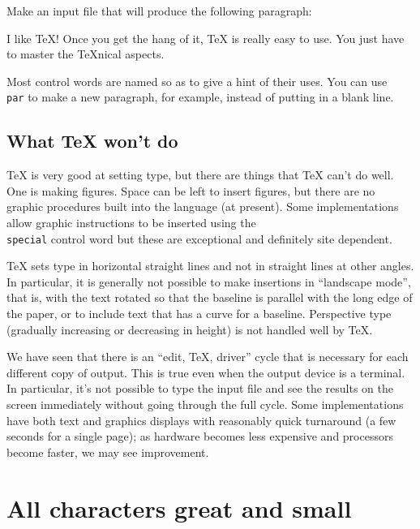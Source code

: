 \exercise Make an input file that will produce the following 
paragraph: 
 
I like \TeX! Once you get the hang of it, \TeX{} is really easy 
to use. You just have to master the \TeX nical aspects. 
 
Most control words are named so as to give a hint of their uses. 
You can use {\tt \\par} to make a new paragraph, for example, 
instead of putting in a blank line. 
 
\subsection{What \TeX{} won't do} 
 
\TeX{} is very good at setting type, but there are things that \TeX{} 
can't do well.  One is making figures.  Space can be left 
to insert figures, but there are no graphic procedures built into 
the language (at present).  Some implementations allow graphic 
instructions to be inserted using the {\tt \\special} control 
word but these are exceptional and definitely site dependent. 
 
\TeX{} sets type in horizontal straight lines and not in 
straight lines at other angles. In particular, it is generally 
not possible to make insertions in ``landscape mode'', that is, 
with the text rotated so that the baseline is parallel with 
the long edge of the paper, or to include text that has a curve for 
a baseline. Perspective type (gradually increasing or 
decreasing in height) is not handled well by \TeX\null. 
 
We have seen that there is an ``edit, \TeX{}, driver'' cycle that 
is necessary for each different copy of output.  This is true 
even when the output device is a terminal.  In particular, it's 
not possible to type the input file and see the results on the 
screen immediately without going through the full cycle.  Some 
implementations have both text and graphics displays with 
reasonably quick turnaround (a few seconds for a single page); as 
hardware becomes less expensive and processors become faster, we 
may see improvement. 
 
 
 
 
 
 
\section{All characters great and small} 
 

